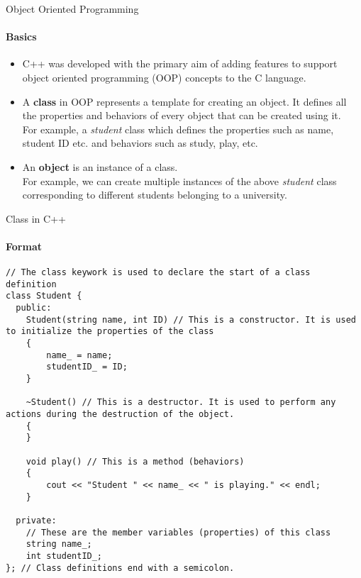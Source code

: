 \documentclass[aspectratio=169]{beamer}
\begin{document}
\begin{frame}[fragile]{Object Oriented Programming}
    \framesubtitle{Basics}
    \begin{itemize}
        \item C++ was developed with the primary aim of adding features to support object oriented programming (OOP) concepts to the C language.
        \item A \textbf{class} in OOP represents a template for creating an object. It defines all the properties and behaviors of every object that can be created using it. \\For example, a \textit{student} class which defines the properties such as name, student ID etc. and behaviors such as study, play, etc.
        \item An \textbf{object} is an instance of a class. \\For example, we can create multiple instances of the above \textit{student} class corresponding to different students belonging to a university.
    \end{itemize}
\end{frame}

\begin{frame}[fragile]{Class in C++}
    \framesubtitle{Format}
    \begin{lstlisting}
// The class keywork is used to declare the start of a class definition
class Student {
  public:
    Student(string name, int ID) // This is a constructor. It is used to initialize the properties of the class
    {
        name_ = name;
        studentID_ = ID;
    }

    ~Student() // This is a destructor. It is used to perform any actions during the destruction of the object.
    {
    }

    void play() // This is a method (behaviors)
    {
        cout << "Student " << name_ << " is playing." << endl;
    }

  private:
    // These are the member variables (properties) of this class
    string name_;
    int studentID_;
}; // Class definitions end with a semicolon.
    \end{lstlisting}
\end{frame}
\end{document}
